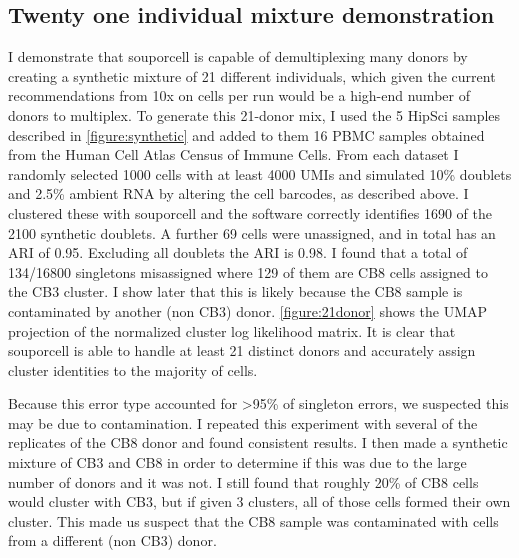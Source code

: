 \subsection{Twenty one individual mixture demonstration}
\par{
I demonstrate that souporcell is capable of demultiplexing many donors by creating a synthetic mixture
of 21 different individuals, which given the current recommendations from 10x on cells per run would be
a high-end number of donors to multiplex. To generate this 21-donor mix, I used the 5 HipSci samples
described in \ref{figure:synthetic} and added to them 16 PBMC samples obtained from the Human Cell Atlas Census of
Immune Cells. From each dataset I randomly selected 1000 cells with at least 4000 UMIs and
simulated 10\% doublets and 2.5\% ambient RNA by altering the cell barcodes, as described above. I
clustered these with souporcell and the software correctly identifies 1690 of the 2100 synthetic doublets.
A further 69 cells were unassigned, and in total has an ARI of 0.95. Excluding all doublets the ARI
is 0.98. I found that a total of 134/16800 singletons misassigned where 129 of them are CB8 cells assigned to
the CB3 cluster. I show later that this is likely because the CB8 sample is contaminated by another
(non CB3) donor. \ref{figure:21donor} shows the UMAP projection of the normalized cluster log likelihood
matrix. It is clear that souporcell is able to handle at least 21 distinct donors and accurately assign cluster
identities to the majority of cells. 
} 

\par{
Because this error type accounted for >95\% of singleton errors, we suspected this may be due to
contamination. I repeated this experiment with several of the replicates of the CB8 donor and found
consistent results. I then made a synthetic mixture of CB3 and CB8 in order to determine if this was
due to the large number of donors and it was not. I still found that roughly 20\% of CB8 cells would
cluster with CB3, but if given 3 clusters, all of those cells formed their own cluster. This made us suspect 
that the CB8 sample was contaminated with cells from a different (non CB3) donor.
}


